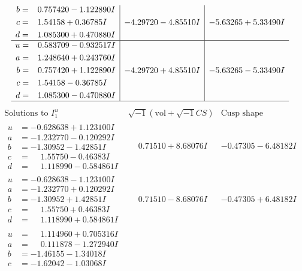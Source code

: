\documentclass[1p]{elsarticle_modified}
\theoremstyle{definition}
\newcommand{\I}{\sqrt{-1}}
\begin{document}
$$\begin{array}{c|c|c}
\begin{aligned}
b &= \phantom{-}0.757420 - 1.122890 I \\
c &= \phantom{-}1.54158 + 0.36785 I \\
d &= \phantom{-}1.085300 + 0.470880 I\end{aligned}
 & -4.29720 - 4.85510 I & -5.63265 + 5.33490 I \\ \hline\begin{aligned}
u &= \phantom{-}0.583709 - 0.932517 I \\
a &= \phantom{-}1.248640 + 0.243760 I \\
b &= \phantom{-}0.757420 + 1.122890 I \\
c &= \phantom{-}1.54158 - 0.36785 I \\
d &= \phantom{-}1.085300 - 0.470880 I\end{aligned}
 & -4.29720 + 4.85510 I & -5.63265 - 5.33490 I\\
 \hline 
 \end{array}$$\newpage$$\begin{array}{c|c|c}  
\text{Solutions to }I^u_{1}& \I (\text{vol} + \sqrt{-1}CS) & \text{Cusp shape}\\
 \hline 
\begin{aligned}
u &= -0.628638 + 1.123100 I \\
a &= -1.232770 - 0.120292 I \\
b &= -1.30952 - 1.42851 I \\
c &= \phantom{-}1.55750 - 0.46383 I \\
d &= \phantom{-}1.118990 - 0.584861 I\end{aligned}
 & \phantom{-}0.71510 + 8.68076 I & -0.47305 - 6.48182 I \\ \hline\begin{aligned}
u &= -0.628638 - 1.123100 I \\
a &= -1.232770 + 0.120292 I \\
b &= -1.30952 + 1.42851 I \\
c &= \phantom{-}1.55750 + 0.46383 I \\
d &= \phantom{-}1.118990 + 0.584861 I\end{aligned}
 & \phantom{-}0.71510 - 8.68076 I & -0.47305 + 6.48182 I \\ \hline\begin{aligned}
u &= \phantom{-}1.114960 + 0.705316 I \\
a &= \phantom{-}0.111878 - 1.272940 I \\
b &= -1.46155 - 1.34018 I \\
c &= -1.62042 - 1.03068 I \\

\end{aligned}
\end{array}$$
\end{document}
